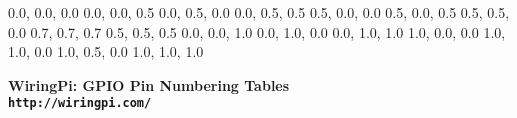 \documentclass[12pt,a4paper]{article}
\begin{document}
\begin{sffamily}
\definecolor{rtb-black}{rgb}  {0.0, 0.0, 0.0}
\definecolor{rtb-navy}{rgb}   {0.0, 0.0, 0.5}
\definecolor{rtb-green}{rgb}  {0.0, 0.5, 0.0}
\definecolor{rtb-teal}{rgb}   {0.0, 0.5, 0.5}
\definecolor{rtb-maroon}{rgb} {0.5, 0.0, 0.0}
\definecolor{rtb-purple}{rgb} {0.5, 0.0, 0.5}
\definecolor{rtb-olive}{rgb}  {0.5, 0.5, 0.0}
\definecolor{rtb-silver}{rgb} {0.7, 0.7, 0.7}
\definecolor{rtb-grey}{rgb}   {0.5, 0.5, 0.5}
\definecolor{rtb-blue}{rgb}   {0.0, 0.0, 1.0}
\definecolor{rtb-lime}{rgb}   {0.0, 1.0, 0.0}
\definecolor{rtb-aqua}{rgb}   {0.0, 1.0, 1.0}
\definecolor{rtb-red}{rgb}    {1.0, 0.0, 0.0}
\definecolor{rtb-yellow}{rgb} {1.0, 1.0, 0.0}
\definecolor{rtb-orange}{rgb} {1.0, 0.5, 0.0}
\definecolor{rtb-white}{rgb}  {1.0, 1.0, 1.0}

\begin{center}
\bfseries{WiringPi: GPIO Pin Numbering Tables}\\
\tt{http://wiringpi.com/}
\end{center}


\end{sffamily}
\end{document}

